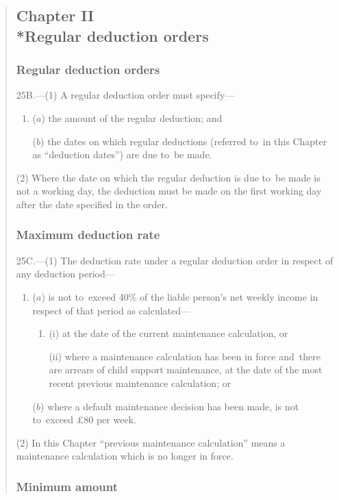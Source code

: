 \documentclass[12pt,a4paper]{article}
\begin{document}
\begin{quotation}
\subsection*{Chapter II\\*Regular deduction orders}

\subsubsection*{Regular deduction orders}

25B.---(1)  A regular deduction order must specify—
\begin{enumerate}\item[]
($a$) the amount of the regular deduction; and

($b$) the dates on which regular deductions (referred to~in this Chapter as “deduction dates”) are due to~be made.
\end{enumerate}

(2) Where the date on which the regular deduction is due to~be made is not a working day, the deduction must be made on the first working day after the date specified in the order.

\subsubsection*{Maximum deduction rate}

25C.---(1)  The deduction rate under a regular deduction order in respect of any deduction period—
\begin{enumerate}\item[]
($a$) is not to~exceed 40\% of the liable person’s net weekly income in respect of that period as calculated—
\begin{enumerate}\item[]
(i) at the date of the current maintenance calculation, or

(ii) where a maintenance calculation has been in force and~there are arrears of child support maintenance, at the date of the most recent previous maintenance calculation; or
\end{enumerate}

($b$) where a default maintenance decision has been made, is not to~exceed £80 per week.
\end{enumerate}

(2) In this Chapter “previous maintenance calculation” means a maintenance calculation which is no longer in force.

\subsubsection*{Minimum amount}


\end{quotation}
\end{document}
